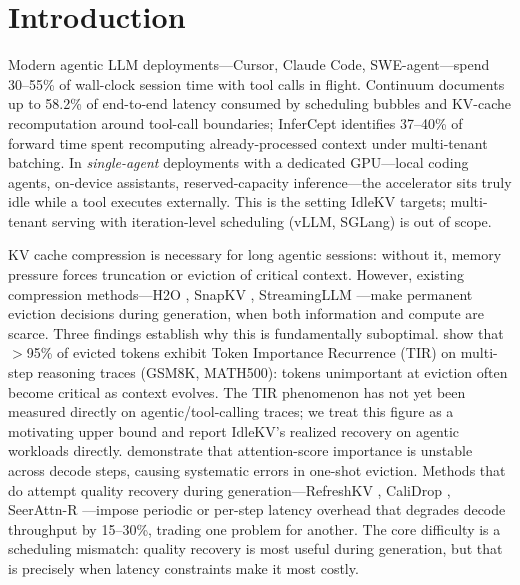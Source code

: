 \documentclass[10pt,twocolumn,letterpaper]{article}
\begin{document}
%
\section{Introduction}
\label{sec:intro}

Modern agentic LLM deployments---Cursor, Claude Code, SWE-agent---spend
30--55\% of wall-clock session time with tool calls in flight.
Continuum \citep{continuum2025} documents up to 58.2\% of end-to-end latency
consumed by scheduling bubbles and KV-cache recomputation around tool-call
boundaries; InferCept \citep{infercept2025} identifies 37--40\% of forward
time spent recomputing already-processed context under multi-tenant
batching.
In \emph{single-agent} deployments with a dedicated GPU---local coding agents,
on-device assistants, reserved-capacity inference---the accelerator sits
truly idle while a tool executes externally.
This is the setting IdleKV targets; multi-tenant serving with iteration-level
scheduling (vLLM, SGLang) is out of scope.

KV cache compression is necessary for long agentic sessions: without it,
memory pressure forces truncation or eviction of critical context.
However, existing compression methods---H2O \citep{h2o2023},
SnapKV \citep{snapkv2024}, StreamingLLM \citep{streamingllm2023}---make
permanent eviction decisions during generation, when both information and
compute are scarce.
Three findings establish why this is fundamentally suboptimal.
\citet{lazyeviction2025} show that $>$95\% of evicted tokens exhibit
Token Importance Recurrence (TIR) on multi-step reasoning traces (GSM8K,
MATH500): tokens unimportant at eviction often become critical as context
evolves.
The TIR phenomenon has not yet been measured directly on agentic/tool-calling
traces; we treat this figure as a motivating upper bound and report
IdleKV's realized recovery on agentic workloads directly.
\citet{defensivekv2026} demonstrate that attention-score importance is
unstable across decode steps, causing systematic errors in one-shot eviction.
Methods that do attempt quality recovery during generation---RefreshKV
\citep{refreshkv2025}, CaliDrop \citep{calidrop2025}, SeerAttn-R
\citep{seerattnr2025}---impose periodic or per-step latency overhead that
degrades decode throughput by 15--30\%, trading one problem for another.
The core difficulty is a scheduling mismatch: quality recovery is most useful
during generation, but that is precisely when latency constraints make it most
costly.
\end{document}
